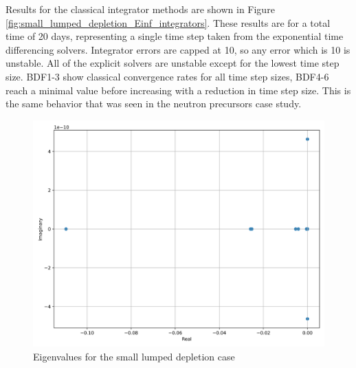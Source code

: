 Results for the classical integrator methods are shown in Figure \ref{fig:small_lumped_depletion_Einf_integrators}. These results are for a total time of 20 days, representing a single time step taken from the exponential time differencing solvers. Integrator errors are capped at 10, so any error which is 10 is unstable. All of the explicit solvers are unstable except for the lowest time step size. BDF1-3 show classical convergence rates for all time step sizes, BDF4-6 reach a minimal value before increasing with a reduction in time step size. This is the same behavior that was seen in the neutron precursors case study. 



\clearpage

\begin{figure}[p]
    \centering
    \includegraphics[width=5in]{images/chapter-5/caseStudies/smallLumpedDepletion/msrLumpedDepletionSmallEigenvalues.png}
    \caption{Eigenvalues for the small lumped depletion case}
    \label{fig:small_lumped_depletion_eigenvalues}
\end{figure}

\clearpage

